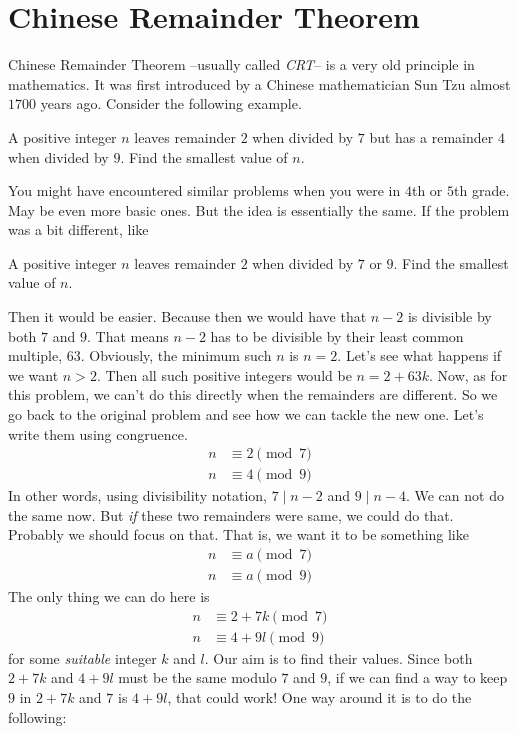 \section{Chinese Remainder Theorem}
Chinese Remainder Theorem --usually called \textit{CRT}-- is a very old principle in mathematics. It was first introduced by a Chinese mathematician Sun Tzu almost $1700$ years ago. Consider the following example.

\begin{problem}
	A positive integer $n$ leaves remainder $2$ when divided by $7$ but has a remainder $4$ when divided by $9$. Find the smallest value of $n$.
\end{problem}
You might have encountered similar problems when you were in $4$th or $5$th grade. May be even more basic ones. But the idea is essentially the same. If the problem was a bit different, like
\begin{problem}
	A positive integer $n$ leaves remainder $2$ when divided by $7$ or $9$. Find the smallest value of $n$.
\end{problem}
Then it would be easier. Because then we would have that $n-2$ is
divisible by both $7$ and $9$. That means $n-2$ has to be divisible by their least common multiple, $63$. Obviously, the minimum such $n$ is $n=2$. Let's see what happens if we want $n>2$. Then all such positive integers would be $n=2+63k$. Now, as for this problem, we can't do this directly when the remainders are different. So we go back to the original problem and see how we can tackle the new one. Let's write them using congruence.
\begin{align*}
	n & \equiv2\pmod{7}\\
	n & \equiv4\pmod{9}
\end{align*}
In other words, using divisibility notation, $7\mid n-2$ and $9\mid n-4$. We can not do the same now. But \textit{if} these two remainders were same, we could do that. Probably we should focus on that. That is, we want it to be something like
	\begin{align*}
		n & \equiv a\pmod 7\\
		n & \equiv a\pmod 9
	\end{align*}
The only thing we can do here is
	\begin{align*}
		n & \equiv2+7k\pmod7\\
		n & \equiv4+9l\pmod9
	\end{align*}
for some \textit{suitable} integer $k$ and $l$. Our aim is to find their values. Since both $2+7k$ and $4+9l$ must be the same modulo $7$ and $9$, if we can find a way to keep $9$ in $2+7k$ and $7$ is $4+9l$, that could work! One way around it is to do the following:
